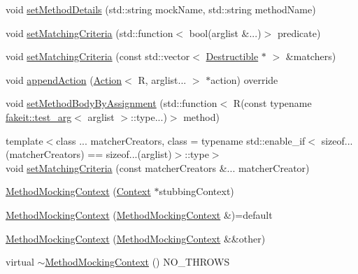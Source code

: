\begin{DoxyCompactItemize}
void \mbox{\hyperlink{classfakeit_1_1MethodMockingContext_a108167e6800e17c71ed5bbed5fcd955a}{set\+Method\+Details}} (std\+::string mock\+Name, std\+::string method\+Name)
\item 
void \mbox{\hyperlink{classfakeit_1_1MethodMockingContext_a43555a14b32453588eb3990a7c6b9a09}{set\+Matching\+Criteria}} (std\+::function$<$ bool(arglist \&...)$>$ predicate)
\item 
void \mbox{\hyperlink{classfakeit_1_1MethodMockingContext_affc5ac50fc419a5f8b5adff8d5d02941}{set\+Matching\+Criteria}} (const std\+::vector$<$ \mbox{\hyperlink{classfakeit_1_1Destructible}{Destructible}} $\ast$ $>$ \&matchers)
\item 
void \mbox{\hyperlink{classfakeit_1_1MethodMockingContext_ad413d04564c89fe134dfb7bae1a1f2a1}{append\+Action}} (\mbox{\hyperlink{structfakeit_1_1Action}{Action}}$<$ R, arglist... $>$ $\ast$action) override
\item 
void \mbox{\hyperlink{classfakeit_1_1MethodMockingContext_ade0a1e36946f68957ee3717147122c4d}{set\+Method\+Body\+By\+Assignment}} (std\+::function$<$ R(const typename \mbox{\hyperlink{structfakeit_1_1test__arg}{fakeit\+::test\+\_\+arg}}$<$ arglist $>$\+::type...)$>$ method)
\item 
{\footnotesize template$<$class ... matcher\+Creators, class  = typename std\+::enable\+\_\+if$<$                sizeof...(matcher\+Creators) == sizeof...(arglist)$>$\+::type$>$ }\\void \mbox{\hyperlink{classfakeit_1_1MethodMockingContext_ab6bf85e9f9f5e5eeb2766ec487a42e20}{set\+Matching\+Criteria}} (const matcher\+Creators \&... matcher\+Creator)
\item 
\mbox{\hyperlink{classfakeit_1_1MethodMockingContext_aa5d0708f0a044fbc8080f64091f8aa71}{Method\+Mocking\+Context}} (\mbox{\hyperlink{structfakeit_1_1MethodMockingContext_1_1Context}{Context}} $\ast$stubbing\+Context)
\item 
\mbox{\hyperlink{classfakeit_1_1MethodMockingContext_aff21ad1769db1e3f81decc54c4b43ed3}{Method\+Mocking\+Context}} (\mbox{\hyperlink{classfakeit_1_1MethodMockingContext}{Method\+Mocking\+Context}} \&)=default
\item 
\mbox{\hyperlink{classfakeit_1_1MethodMockingContext_af4dcf1f0a24f7cedd1d4c5ee23d1a313}{Method\+Mocking\+Context}} (\mbox{\hyperlink{classfakeit_1_1MethodMockingContext}{Method\+Mocking\+Context}} \&\&other)
\item 
virtual \mbox{\hyperlink{classfakeit_1_1MethodMockingContext_a92068a8b1affe1c7be6eafc12297c8c2}{$\sim$\+Method\+Mocking\+Context}} () N\+O\+\_\+\+T\+H\+R\+O\+WS

\end{DoxyCompactItemize}
